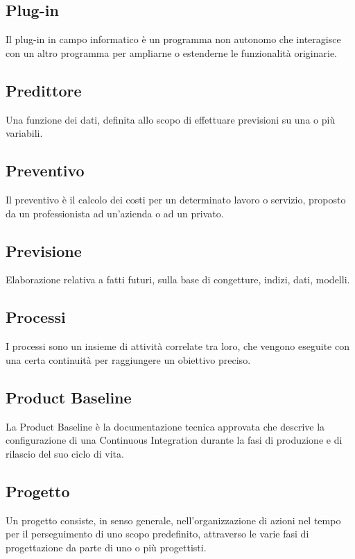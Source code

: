 
\subsection*{Plug-in}
Il plug-in in campo informatico è un programma non autonomo che interagisce con un altro programma per ampliarne o estenderne le funzionalità originarie.

\subsection*{Predittore}
Una funzione dei dati, definita allo scopo di effettuare previsioni su una o più variabili.

\subsection*{Preventivo}
Il preventivo è il calcolo dei costi per un determinato lavoro o servizio, proposto da un professionista ad un'azienda o ad un privato.

\subsection*{Previsione}
Elaborazione relativa a fatti futuri, sulla base di congetture, indizi, dati, modelli.

\subsection*{Processi}
I processi sono un insieme di attività correlate tra loro, che vengono eseguite con una certa continuità per raggiungere un obiettivo preciso.

\subsection*{Product Baseline}
La Product Baseline è la documentazione tecnica approvata che descrive la configurazione di una Continuous Integration durante la fasi di produzione e di rilascio del suo ciclo di vita.

\subsection*{Progetto}
Un progetto consiste, in senso generale, nell'organizzazione di azioni nel tempo per il perseguimento di uno scopo predefinito, attraverso le varie fasi di progettazione da parte di uno o più progettisti.

